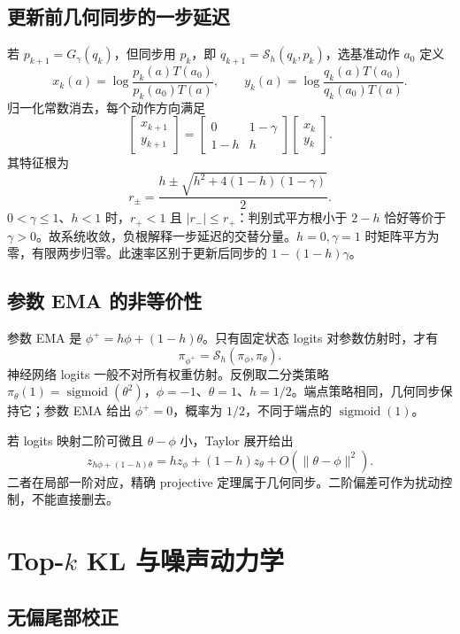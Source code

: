 \subsection{更新前几何同步的一步延迟}

若 $p_{k+1}=G_\gamma(q_k)$，但同步用 $p_k$，即 $q_{k+1}=\mathcal S_h(q_k,p_k)$，选基准动作 $a_0$ 定义
\[
 x_k(a)=\log\frac{p_k(a)T(a_0)}{p_k(a_0)T(a)},\qquad
 y_k(a)=\log\frac{q_k(a)T(a_0)}{q_k(a_0)T(a)}.
\]
归一化常数消去，每个动作方向满足
\[
 \begin{bmatrix}x_{k+1}\\y_{k+1}\end{bmatrix}
 =\begin{bmatrix}0&1-\gamma\\1-h&h\end{bmatrix}
 \begin{bmatrix}x_k\\y_k\end{bmatrix}.
\]
其特征根为
\[
 r_\pm=\frac{h\pm\sqrt{h^2+4(1-h)(1-\gamma)}}2.
\]
$0<\gamma\le1$、$h<1$ 时，$r_+<1$ 且 $|r_-|\le r_+$：判别式平方根小于 $2-h$ 恰好等价于 $\gamma>0$。故系统收敛，负根解释一步延迟的交替分量。$h=0,\gamma=1$ 时矩阵平方为零，有限两步归零。此速率区别于更新后同步的 $1-(1-h)\gamma$。

\subsection{参数 EMA 的非等价性}

参数 EMA 是 $\phi^+=h\phi+(1-h)\theta$。只有固定状态 logits 对参数仿射时，才有
\[
 \pi_{\phi^+}=\mathcal S_h(\pi_\phi,\pi_\theta).
\]
神经网络 logits 一般不对所有权重仿射。反例取二分类策略 $\pi_\theta(1)=\operatorname{sigmoid}(\theta^2)$，$\phi=-1$、$\theta=1$、$h=1/2$。端点策略相同，几何同步保持它；参数 EMA 给出 $\phi^+=0$，概率为 $1/2$，不同于端点的 $\operatorname{sigmoid}(1)$。

若 logits 映射二阶可微且 $\theta-\phi$ 小，Taylor 展开给出
\[
 z_{h\phi+(1-h)\theta}=hz_\phi+(1-h)z_\theta
 +O(\|\theta-\phi\|^2).
\]
二者在局部一阶对应，精确 projective 定理属于几何同步。二阶偏差可作为扰动控制，不能直接删去。

\section{Top-$k$ KL 与噪声动力学}

\subsection{无偏尾部校正}

